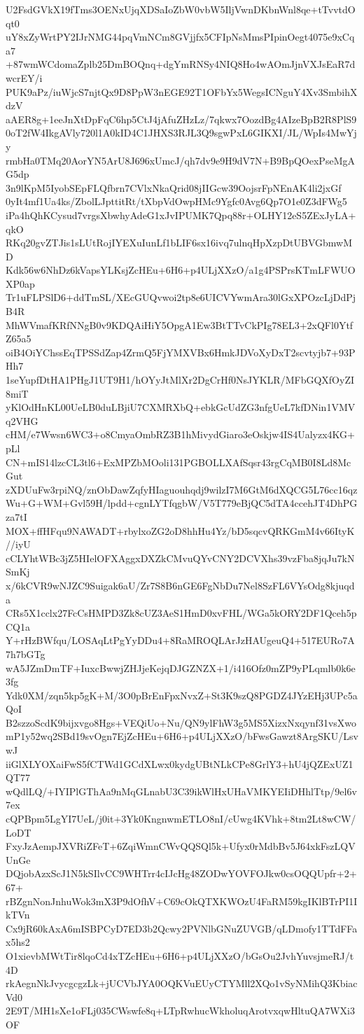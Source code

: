 U2FsdGVkX19fTms3OENxUjqXDSaIoZbW0vbW5IljVwnDKbnWnl8qe+tTvvtdOqt0
uY8xZyWrtPY2IJrNMG44pqVmNCm8GVjjfx5CFIpNsMmsPIpinOegt4075e9xCqa7
+87wmWCdomaZplb25DmBOQnq+dgYmRNSy4NIQ8Ho4wAOmJjnVXJsEaR7dwcrEY/i
PUK9aPz/iuWjcS7njtQx9D8PpW3nEGE92T1OFbYx5WegsICNguY4Xv3SmbihXdzV
aAER8g+1eeJnXtDpFqC6hp5CtJ4jAfuZHzLz/7qkwx7OozdBg4AIzeBpB2R8PlS9
0oT2fW4IkgAVly720l1A0kID4C1JHXS3RJL3Q9sgwPxL6GIKXI/JL/WpIs4MwYjy
rmbHa0TMq20AorYN5ArU8J696xUmcJ/qh7dv9e9H9dV7N+B9BpQOexPseMgAG5dp
3n9lKpM5IyobSEpFLQfbrn7CVlxNkaQrid08jIIGcw39OojsrFpNEnAK4li2jxGf
0yIt4mf1Ua4ks/ZbolLJpttitRt/tXbpVdOwpHMc9Ygfc0Avg6Qp7O1e0Z3dFWg5
iPa4hQhKCysud7vrgsXbwhyAdeG1xJvIPUMK7Qpq88r+OLHY12eS5ZExJyLA+qkO
RKq20gvZTJis1sLUtRojIYEXuIunLf1bLIF6sx16ivq7ulnqHpXzpDtUBVGbmwMD
Kdk56w6NhDz6kVapsYLKsjZcHEu+6H6+p4ULjXXzO/a1g4PSPrsKTmLFWUOXP0ap
Tr1uFLPSlD6+ddTmSL/XEcGUQvwoi2tp8e6UICVYwmAra30lGxXPOzcLjDdPjB4R
MhWVmafKRfNNgB0v9KDQAiHiY5OpgA1Ew3BtTTvCkPIg78EL3+2xQFl0YtfZ65a5
oiB4OiYChssEqTPSSdZap4ZrmQ5FjYMXVBx6HmkJDVoXyDxT2scvtyjb7+93PHh7
1seYupfDtHA1PHgJ1UT9H1/hOYyJtMlXr2DgCrHf0NsJYKLR/MFbGQXfOyZI8miT
yKlOdHnKL00UeLB0duLBjiU7CXMRXbQ+ebkGcUdZG3nfgUeL7kfDNin1VMVq2VHG
cHM/e7Wwsn6WC3+o8CmyaOmbRZ3B1hMivydGiaro3eOskjw4IS4Ualyzx4KG+pLl
CN+mIS14lzcCL3tl6+ExMPZbMOoli131PGBOLLXAfSqsr43rgCqMB0I8Ld8McGut
zXDUuFw3rpiNQ/znObDawZqfyHIaguouhqdj9wilzI7M6GtM6dXQCG5L76cc16qz
Wu+G+WM+Gvl59H/lpdd+cgnLYTfqgbW/V5T779eBjQC5dTA4ccehJT4DhPGza7tI
MOX+ffHFqu9NAWADT+rbylxoZG2oD8hhHu4Yz/bD5sqcvQRKGmM4v66ItyK//iyU
cCLYhtWBc3jZ5HIelOFXAggxDXZkCMvuQYvCNY2DCVXhs39vzFba8jqJu7kNSmKj
x/6kCVR9wNJZC9Suigak6aU/Zr7S8B6nGE6FgNbDu7Nel8SzFL6VYsOdg8kjuqda
CRs5X1cclx27FcCsHMPD3Zk8cUZ3AeS1HmD0xvFHL/WGa5kORY2DF1Qceh5pCQ1a
Y+rHzBWfqu/LOSAqLtPgYyDDu4+8RaMROQLArJzHAUgeuQ4+517EURo7A7h7bGTg
wA5JZmDmTF+IuxcBwwjZHJjeKejqDJGZNZX+1/i416Ofz0mZP9yPLqmlb0k6e3fg
Ydk0XM/zqn5kp5gK+M/3O0pBrEnFpxNvxZ+St3K9szQ8PGDZ4JYzEHj3UPc5aQoI
B2szzoScdK9bijxvgo8Hgs+VEQiUo+Nu/QN9ylFhW3g5MS5XizxNxqynf31vsXwo
mP1y52wq2SBd19svOgn7EjZcHEu+6H6+p4ULjXXzO/bFwsGawzt8ArgSKU/LsvwJ
iiGlXLYOXaiFwS5fCTWd1GCdXLwx0kydgUBtNLkCPe8GrlY3+hU4jQZExUZ1QT77
wQdlLQ/+IYIPlGThAa9nMqGLnabU3C39ikWlHxUHaVMKYEIiDHhlTtp/9el6v7ex
cQPBpm5LgYI7UeL/j0it+3Yk0KngnwmETLO8nI/cUwg4KVhk+8tm2Lt8wCW/LoDT
FxyJzAempJXVRiZFeT+6ZqiWmnCWvQQSQl5k+Ufyx0rMdbBv5J64xkFszLQVUnGe
DQjobAzxScJ1N5kSIlvCC9WHTrr4cIJcHg48ZODwYOVFOJkw0csOQQUpfr+2+67+
rBZgnNonJnhuWok3mX3P9dOfhV+C69cOkQTXKWOzU4FaRM59kgIKlBTrPI1IkTVn
Cx9jR60kAxA6mISBPCyD7ED3b2Qcwy2PVNlbGNuZUVGB/qLDmofy1TTdFFax5hs2
O1xievbMWtTir8lqoCd4xTZcHEu+6H6+p4ULjXXzO/bGsOu2JvhYuvsjmeRJ/t4D
rkAegnNkJvycgcgzLk+jUCVbJYA0OQKVuEUyCTYMll2XQo1vSyNMihQ3KbiacVd0
2E9T/MH1sXe1oFLj035CWswfe8q+LTpRwhucWkholuqArotvxqwHltuQA7WXi3OF

